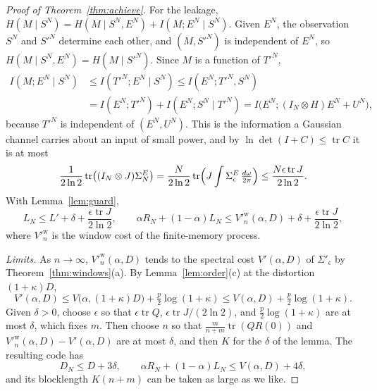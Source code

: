 \documentclass[11pt,onecolumn]{IEEEtran}
\newcommand{\tr}{\operatorname{tr}}
\newcommand{\dw}{\tfrac{d\omega}{2\pi}}
\begin{document}
\begin{proof}[Proof of Theorem~\ref{thm:achieve}]
For the leakage,
$H(M\mid S^N)=H(M\mid S^N,E^N)+I(M;E^N\mid S^N)$. Given $E^N$, the
observation $S^N$ and $S'^N$ determine each other, and $(M,S'^N)$ is
independent of $E^N$, so $H(M\mid S^N,E^N)=H(M\mid S'^N)$. Since $M$ is a
function of $T'^N$,
\begin{align*}
I(M;E^N\mid S^N)&\le I(T'^N;E^N\mid S^N)\le I(E^N;T'^N,S^N)\\
&=I(E^N;T'^N)+I(E^N;S^N\mid T'^N)=I\bigl(E^N;(I_N\otimes H)E^N+U^N\bigr),
\end{align*}
because $T'^N$ is independent of $(E^N,U^N)$. This is the information a
Gaussian channel carries about an input of small power, and by
$\ln\det(I+C)\le\tr C$ it is at most
\[
\frac1{2\ln2}\tr\bigl((I_N\otimes J)\Sigma^E_N\bigr)
=\frac{N}{2\ln2}\tr\Bigl(J\int\Sigma^E_\epsilon\,\dw\Bigr)\le\frac{N\epsilon\tr J}{2\ln2}.
\]
With Lemma~\ref{lem:guard},
\[
L_N\le L'+\delta+\frac{\epsilon\tr J}{2\ln2},
\qquad
\alpha R_N+(1-\alpha)L_N\le V'^{\mathrm w}_n(\alpha,D)+\delta+\frac{\epsilon\tr J}{2\ln2},
\]
where $V'^{\mathrm w}_n$ is the window cost of the finite-memory process.

\emph{Limits.} As $n\to\infty$, $V'^{\mathrm w}_n(\alpha,D)$ tends to the
spectral cost $V'(\alpha,D)$ of $\Sigma'_\epsilon$ by
Theorem~\ref{thm:windows}(a). By Lemma~\ref{lem:order}(c) at the
distortion $(1+\kappa)D$,
\[
V'(\alpha,D)\le V\bigl(\alpha,(1+\kappa)D\bigr)+\tfrac p2\log(1+\kappa)\le V(\alpha,D)+\tfrac p2\log(1+\kappa).
\]
Given $\delta>0$, choose $\epsilon$ so that $\epsilon\tr Q$,
$\epsilon\tr J/(2\ln2)$, and $\tfrac p2\log(1+\kappa)$ are at most
$\delta$, which fixes $m$. Then choose $n$ so that
$\tfrac m{n+m}\tr(QR(0))$ and $V'^{\mathrm w}_n(\alpha,D)-V'(\alpha,D)$ are
at most $\delta$, and then $K$ for the $\delta$ of the lemma. The
resulting code has
\[
D_N\le D+3\delta,\qquad \alpha R_N+(1-\alpha)L_N\le V(\alpha,D)+4\delta ,
\]
and its blocklength $K(n+m)$ can be taken as large as we like.


\end{proof}
\end{document}
